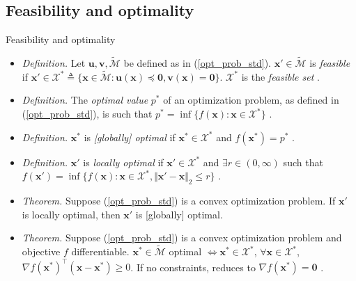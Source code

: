 \documentclass{beamer}
\numberwithin{equation}{section}
\newcommand{\aref}[1]{\alert{\ref{#1}}}
\begin{document}
\subsection{Feasibility and optimality}

\begin{frame}{Feasibility and optimality}
    \begin{itemize}
        \item
        \textit{Definition.} Let $ \mathbf{u}, \mathbf{v},
        \tilde{\mathcal{M}} $ be defined as in (\aref{opt_prob_std}).
        $ \mathbf{x}' \in \tilde{\mathcal{M}} $ is \textit{feasible} if
        $ \mathbf{x}' \in \mathcal{X}^*
        \triangleq \{\mathbf{x} \in \tilde{\mathcal{M}} :
        \mathbf{u}(\mathbf{x}) \preceq \mathbf{0}, \mathbf{v}(\mathbf{x}) =
        \mathbf{0}\} $. $ \mathcal{X}^* $ is the \textit{feasible set}
        \cite{bv_convex_opt}.

        \item
        \textit{Definition.} The \textit{optimal value} $ p^* $
        of an optimization problem, as defined in (\aref{opt_prob_std}), is
        such that $ p^* = \inf\{f(\mathbf{x}) : \mathbf{x} \in
        \mathcal{X}^*\} $ \cite{bv_convex_opt}.

        \item
        \textit{Definition.} $ \mathbf{x}^* $ is \textit{[globally] optimal}
        if $ \mathbf{x}^* \in \mathcal{X}^* $ and $ f(\mathbf{x}^*) = p^* $ 
        \cite{bv_convex_opt}.

        \item
        \textit{Definition.} $ \mathbf{x}' $ is \textit{locally optimal} if
        $ \mathbf{x}' \in \mathcal{X}^* $ and $ \exists r \in (0, \infty) $
        such that $ f(\mathbf{x}') = \inf\{
            f(\mathbf{x}) : \mathbf{x} \in \mathcal{X}^*,
            \Vert\mathbf{x}' - \mathbf{x}\Vert_2 \le r
        \}$ \cite{bv_convex_opt}.

        \item
        \textit{Theorem.} Suppose (\aref{opt_prob_std}) is a \alert{convex}
        optimization problem. If $ \mathbf{x}' $ is locally optimal, then
        $ \mathbf{x}' $ is [globally] optimal.

        \item
        \textit{Theorem.} Suppose (\aref{opt_prob_std}) is a \alert{convex}
        optimization problem and objective $ f $ differentiable.
        $ \mathbf{x}^* \in \tilde{\mathcal{M}} $ optimal
        $ \Leftrightarrow \mathbf{x}^* \in \mathcal{X}^* $,
        $ \forall \mathbf{x} \in \mathcal{X}^* $,
        $ \nabla f(\mathbf{x}^*)^\top(\mathbf{x} - \mathbf{x}^*) \ge 0 $.
        If no constraints, reduces to $ \nabla f(\mathbf{x}^*) = \mathbf{0} $
        \cite{bv_convex_opt}.
    \end{itemize}
\end{frame}
\end{document}
